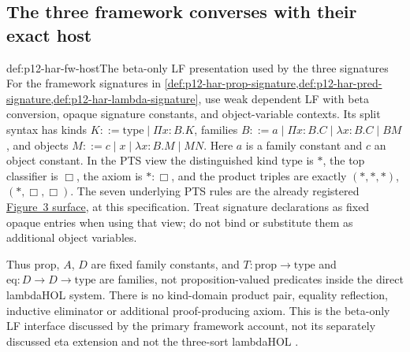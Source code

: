 \subsection{The three framework converses with their exact host}

\begin{hbdefinition}{def:p12-har-fw-host}{The beta-only LF presentation used by the three signatures}
For the framework signatures in
\cref{def:p12-har-prop-signature,def:p12-har-pred-signature,def:p12-har-lambda-signature},
use weak dependent LF with beta conversion, opaque signature constants,
and object-variable contexts. Its split syntax has kinds
\(K::=\mathrm{type}\mid\Pi x:B.K\), families
\(B::=a\mid\Pi x:B.C\mid\lambda x:B.C\mid BM\), and
objects \(M::=c\mid x\mid\lambda x:B.M\mid MN\).
Here \(a\) is a family constant and \(c\) an object constant.
In the PTS view the distinguished kind \(\mathrm{type}\) is
\(\ast\), the top classifier is \(\Box\), the axiom is
\(\ast:\Box\), and the product triples are exactly
\((\ast,\ast,\ast)\), \((\ast,\Box,\Box)\).
The seven underlying PTS rules are the already registered
\hyperref[sheet:p12-har-pts]{Figure~3 surface}, at this specification.
Treat signature declarations as fixed opaque entries when using that view;
do not bind or substitute them as additional object variables.

Thus \(\mathrm{prop}\), \(A\), \(D\) are fixed family constants,
and \(T:\mathrm{prop}\to\mathrm{type}\) and
\(\mathrm{eq}:D\to D\to\mathrm{type}\) are families, not
proposition-valued predicates inside the direct lambdaHOL system.
There is no kind-domain product pair, equality reflection, inductive
eliminator or additional proof-producing axiom. This is the beta-only
LF interface discussed by the primary framework account, not its
separately discussed eta extension and not the three-sort lambdaHOL
\cite[pp.~1160--1163]{BarendregtGeuvers2001}
\cite[sections~2.1 and 2.4]{HarperHonsellPlotkin1993LF}.
\end{hbdefinition}


